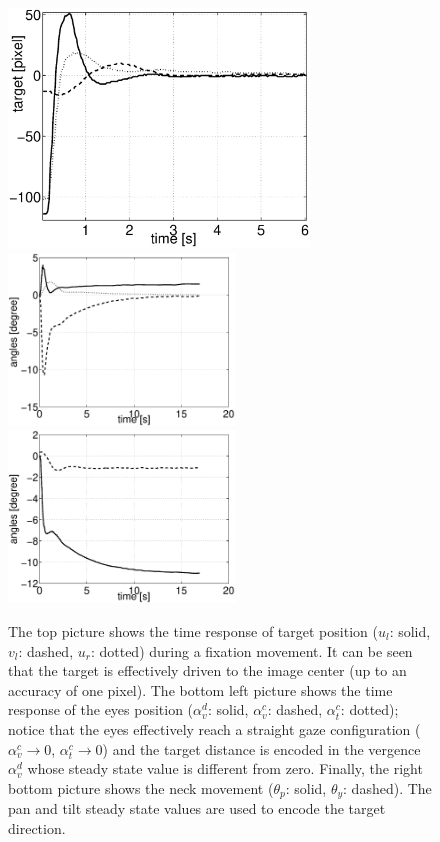 \begin{figure}[!ht]
\centering
\includegraphics[width=80mm]{Figure/TimeResponseImage.eps}\\ \includegraphics[width=60mm]{Figure/TimeResponseEyes.eps}
\includegraphics[width=60mm]{Figure/TimeResponseEyesNeck.eps}
\caption{The top picture shows the time response of target position 
($u_l$: solid, $v_l$: dashed, $u_r$: dotted) during a fixation movement. It can be seen 
that the target is effectively driven to the image center (up 
to an accuracy of one pixel). The bottom left picture shows the time 
response of the eyes position ($\alpha_v^d$: solid, $\alpha_v^c$: dashed, 
$\alpha_t^c$: dotted); notice that the eyes 
effectively reach a straight gaze configuration ($\alpha_v^c 
\rightarrow 0$, $\alpha_t^c \rightarrow 0$) and the target distance is
encoded in the vergence $\alpha_v^d$ whose steady state value is different
from zero. Finally, the right bottom picture shows the neck movement ($\theta_p$: solid,
 $\theta_y$: dashed). The pan and tilt steady state 
values are used to encode the target direction.}
\label{Fig:TimeResponse}
\end{figure}
